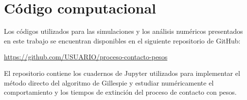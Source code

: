 \section*{Código computacional}
Los códigos utilizados para las simulaciones y los análisis numéricos
presentados en este trabajo se encuentran disponibles en el siguiente
repositorio de GitHub:

\begin{center}
\url{https://github.com/USUARIO/proceso-contacto-pesos}
\end{center}

El repositorio contiene los cuadernos de Jupyter utilizados para implementar
el método directo del algoritmo de Gillespie y estudiar numéricamente el
comportamiento y los tiempos de extinción del proceso de contacto con pesos.
